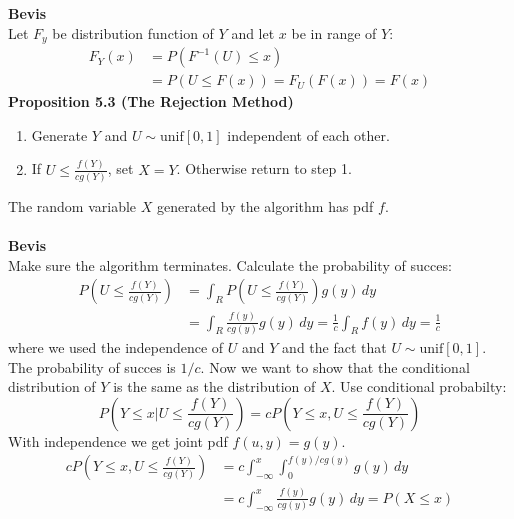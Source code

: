 \documentclass[12pt,a4paper]{report}
\begin{document}
\textbf{Bevis}\\
Let $F_y$ be distribution function of $Y$ and let $x$ be in range of $Y$:
\begin{align*}
F_Y(x)&=P(F^{-1}(U)\leq x)\\
&=P(U\leq F(x))=F_U(F(x))=F(x)
\end{align*}
\textbf{Proposition 5.3 (The Rejection Method)}
\begin{enumerate}
\item Generate $Y$ and $U\sim\text{unif}[0,1]$ independent of each other.
\item If $U\leq\frac{f(Y)}{cg(Y)}$, set $X=Y$. Otherwise return to step 1.
\end{enumerate}
The random variable $X$ generated by the algorithm has pdf $f$.\\\\
\textbf{Bevis}\\
Make sure the algorithm terminates. Calculate the probability of succes:
\begin{align*}
P\left(U\leq\frac{f(Y)}{cg(Y)}\right)&=\int_R\!P\left(U\leq\frac{f(Y)}{cg(Y)}\right)g(y)\,dy\\
&=\int_R\!\frac{f(y)}{cg(y)}g(y)\,dy=\frac{1}{c}\int_R\!f(y)\,dy=\frac{1}{c}
\end{align*}
where we used the independence of $U$ and $Y$ and the fact that $U\sim\text{unif}[0,1]$. The probability of succes is $1/c$. Now we want to show that the conditional distribution of $Y$ is the same as the distribution of $X$. Use conditional probabilty:
\begin{equation}
P\left(Y\leq x|U\leq\frac{f(Y)}{cg(Y)}\right)=cP\left(Y\leq x,U\leq\frac{f(Y)}{cg(Y)}\right)
\end{equation}
With independence we get joint pdf $f(u,y)=g(y)$.
\begin{align*}
cP\left(Y\leq x,U\leq\frac{f(Y)}{cg(Y)}\right)&=c\int_{-\infty}^x\!\int_0^{f(y)/cg(y)}\!g(y)\,dy\\
&=c\int_{-\infty}^x\!\frac{f(y)}{cg(y)}g(y)\,dy=P(X\leq x)
\end{align*}
\end{document}
